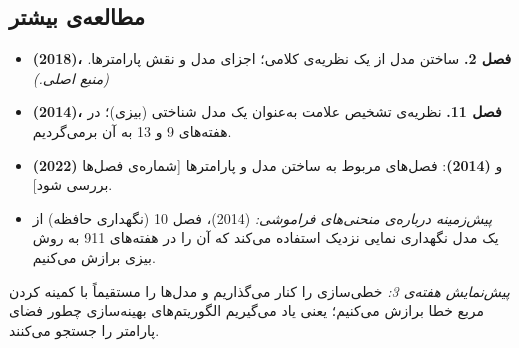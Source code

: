 \subsection{مطالعه‌ی بیشتر}

\begin{itemize}
\tightlist
\item
  \textbf{ \lr{\&}  (2018)، فصل 2.} ساختن مدل از
  یک نظریه‌ی کلامی؛ اجزای مدل و نقش پارامترها. \emph{(منبع اصلی.)}
\item
  \textbf{ \lr{\&}  (2014)، فصل 11.} نظریه‌ی تشخیص
  علامت به‌عنوان یک مدل شناختی (بیزی)؛ در هفته‌های 9 و 13 به آن برمی‌گردیم.
\item
  \textbf{ (2022)} و \textbf{ (2014)}: فصل‌های
  مربوط به ساختن مدل و پارامترها {[}شماره‌ی فصل‌ها بررسی شود{]}.
\item
  \emph{پیش‌زمینه درباره‌ی منحنی‌های فراموشی:}  \lr{\&} 
  (2014)، فصل 10 (نگهداری حافظه) از یک مدل نگهداری نمایی نزدیک استفاده
  می‌کند که آن را در هفته‌های 9\lr{--}11 به روش بیزی برازش می‌کنیم.
\end{itemize}

\emph{پیش‌نمایش هفته‌ی 3:} خطی‌سازی را کنار می‌گذاریم و مدل‌ها را مستقیماً با
کمینه کردن مربع خطا برازش می‌کنیم؛ یعنی یاد می‌گیریم الگوریتم‌های بهینه‌سازی
چطور فضای پارامتر را جستجو می‌کنند.
